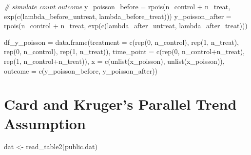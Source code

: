 \documentclass[
]{article}
\newenvironment{Shaded}{\begin{snugshade}}{\end{snugshade}}
\newcommand{\AttributeTok}[1]{\textcolor[rgb]{0.77,0.63,0.00}{#1}}
\newcommand{\CommentTok}[1]{\textcolor[rgb]{0.56,0.35,0.01}{\textit{#1}}}
\newcommand{\DecValTok}[1]{\textcolor[rgb]{0.00,0.00,0.81}{#1}}
\newcommand{\FunctionTok}[1]{\textcolor[rgb]{0.00,0.00,0.00}{#1}}
\newcommand{\NormalTok}[1]{#1}
\newcommand{\OtherTok}[1]{\textcolor[rgb]{0.56,0.35,0.01}{#1}}
\newcommand{\SpecialCharTok}[1]{\textcolor[rgb]{0.00,0.00,0.00}{#1}}
\newcommand{\StringTok}[1]{\textcolor[rgb]{0.31,0.60,0.02}{#1}}
\begin{document}
\begin{Shaded}
\begin{Highlighting}[]
\CommentTok{\# simulate count outcome}
\NormalTok{y\_poisson\_before }\OtherTok{=} \FunctionTok{rpois}\NormalTok{(n\_control }\SpecialCharTok{+}\NormalTok{ n\_treat, }\FunctionTok{exp}\NormalTok{(}\FunctionTok{c}\NormalTok{(lambda\_before\_untreat, lambda\_before\_treat)))}
\NormalTok{y\_poisson\_after }\OtherTok{=} \FunctionTok{rpois}\NormalTok{(n\_control }\SpecialCharTok{+}\NormalTok{ n\_treat, }\FunctionTok{exp}\NormalTok{(}\FunctionTok{c}\NormalTok{(lambda\_after\_untreat, lambda\_after\_treat)))}

\NormalTok{df\_y\_poisson }\OtherTok{=} \FunctionTok{data.frame}\NormalTok{(}\AttributeTok{treatment =} \FunctionTok{c}\NormalTok{(}\FunctionTok{rep}\NormalTok{(}\DecValTok{0}\NormalTok{, n\_control), }\FunctionTok{rep}\NormalTok{(}\DecValTok{1}\NormalTok{, n\_treat), }\FunctionTok{rep}\NormalTok{(}\DecValTok{0}\NormalTok{, n\_control), }\FunctionTok{rep}\NormalTok{(}\DecValTok{1}\NormalTok{, n\_treat)),}
                        \AttributeTok{time\_point =} \FunctionTok{c}\NormalTok{(}\FunctionTok{rep}\NormalTok{(}\DecValTok{0}\NormalTok{, n\_control}\SpecialCharTok{+}\NormalTok{n\_treat), }\FunctionTok{rep}\NormalTok{(}\DecValTok{1}\NormalTok{, n\_control}\SpecialCharTok{+}\NormalTok{n\_treat)),}
                        \AttributeTok{x =} \FunctionTok{c}\NormalTok{(}\FunctionTok{unlist}\NormalTok{(x\_poisson), }\FunctionTok{unlist}\NormalTok{(x\_poisson)),}
                        \AttributeTok{outcome =} \FunctionTok{c}\NormalTok{(y\_poisson\_before, y\_poisson\_after))}
\end{Highlighting}
\end{Shaded}

\hypertarget{card-and-krugers-parallel-trend-assumption}{%
\section{Card and Kruger's Parallel Trend
Assumption}\label{card-and-krugers-parallel-trend-assumption}}

\begin{Shaded}
\begin{Highlighting}[]
\NormalTok{dat }\OtherTok{\textless{}{-}} \FunctionTok{read\_table2}\NormalTok{(}\StringTok{\textquotesingle{}public.dat\textquotesingle{}}\NormalTok{)}
\end{Highlighting}
\end{Shaded}
\end{document}

